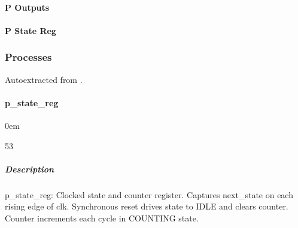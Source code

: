 \documentclass[letterpaper,10pt,english]{sphinxmanual}
\begin{document}
\paragraph{P Outputs}
\label{\detokenize{modules/pwm_controller/timing:p-outputs}}
\noindent{}


\paragraph{P State Reg}
\label{\detokenize{modules/pwm_controller/timing:p-state-reg}}
\noindent{}

\sphinxstepscope


\subsubsection{Processes}
\label{\detokenize{modules/pwm_controller/processes/index:processes}}\label{\detokenize{modules/pwm_controller/processes/index::doc}}
\sphinxAtStartPar
Auto\sphinxhyphen{}extracted from .

\sphinxstepscope


\paragraph{p\_state\_reg}
\label{\detokenize{modules/pwm_controller/processes/p_state_reg:p-state-reg}}\label{\detokenize{modules/pwm_controller/processes/p_state_reg::doc}}
\begin{DUlineblock}{0em}
\item[]  
\item[]  53
\item[]  
\item[]  
\end{DUlineblock}


\subparagraph{Description}
\label{\detokenize{modules/pwm_controller/processes/p_state_reg:description}}
\sphinxAtStartPar
p\_state\_reg: Clocked state and counter register.
Captures next\_state on each rising edge of clk.
Synchronous reset drives state to IDLE and clears counter.
Counter increments each cycle in COUNTING state.
\end{document}
